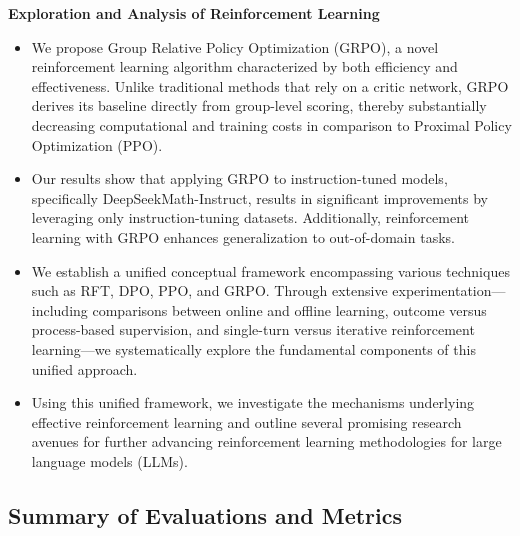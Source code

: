 \textbf{Exploration and Analysis of Reinforcement Learning}

\begin{itemize}[topsep=0pt]
    \item We propose Group Relative Policy Optimization (GRPO), a novel reinforcement learning algorithm characterized by both efficiency and effectiveness. Unlike traditional methods that rely on a critic network, GRPO derives its baseline directly from group-level scoring, thereby substantially decreasing computational and training costs in comparison to Proximal Policy Optimization (PPO).
    \item Our results show that applying GRPO to instruction-tuned models, specifically DeepSeekMath-Instruct, results in significant improvements by leveraging only instruction-tuning datasets. Additionally, reinforcement learning with GRPO enhances generalization to out-of-domain tasks.
    \item We establish a unified conceptual framework encompassing various techniques such as RFT, DPO, PPO, and GRPO. Through extensive experimentation—including comparisons between online and offline learning, outcome versus process-based supervision, and single-turn versus iterative reinforcement learning—we systematically explore the fundamental components of this unified approach.
    \item Using this unified framework, we investigate the mechanisms underlying effective reinforcement learning and outline several promising research avenues for further advancing reinforcement learning methodologies for large language models (LLMs).
\end{itemize}

\subsection{Summary of Evaluations and Metrics}


